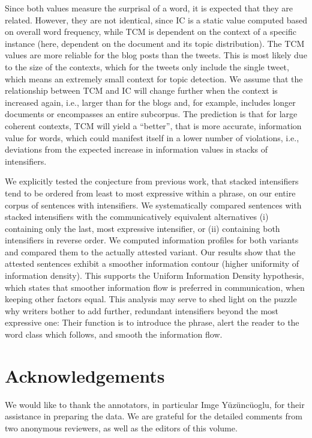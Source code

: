 \documentclass[output=paper,colorlinks,citecolor=brown]{langscibook}
\begin{document}
Since both values measure the surprisal of a word, it is expected that they are related. However, they are not identical, since IC is a static value computed based on overall word frequency, while TCM is dependent on the context of a specific instance (here, dependent on the document and its topic distribution). The TCM values are more reliable for the blog posts than the tweets. This is most likely due to the size of the contexts, which for the tweets only include the single tweet, which means an extremely small context for topic detection. 
We assume that the relationship between TCM and IC will change further when the context is increased again, i.e., larger than for the blogs and, for example, includes longer documents or encompasses an entire subcorpus. The prediction is that for large coherent contexts, TCM will yield a ``better'', that is more accurate, information value for words, which could manifest itself in a lower number of violations, i.e., deviations from the expected increase in information values in stacks of intensifiers. 

We explicitly tested the conjecture from previous work, that stacked intensifiers tend to be ordered from least to most expressive within a phrase, on our entire corpus of sentences with intensifiers. We systematically compared sentences with stacked intensifiers with the communicatively equivalent alternatives (i) containing only the last, most expressive intensifier, or (ii) containing both intensifiers in reverse order. We computed information profiles for both variants and compared them to the actually attested variant. Our results show that the attested sentences exhibit a smoother information contour (higher uniformity of information density). This supports the Uniform Information Density hypothesis, which states that smoother information flow is preferred in communication, when keeping other factors equal. This analysis may serve to shed light on the puzzle why writers bother to add further, redundant intensifiers beyond the most expressive one: Their function is to introduce the phrase, alert the reader to the word class which follows, and smooth the information flow.

\section*{Acknowledgements}
We would like to thank the annotators, in particular Imge Yüzüncüoglu, for their assistance in preparing the data. We are grateful for the detailed comments from two anonymous reviewers, as well as the editors of this volume.
\end{document}
